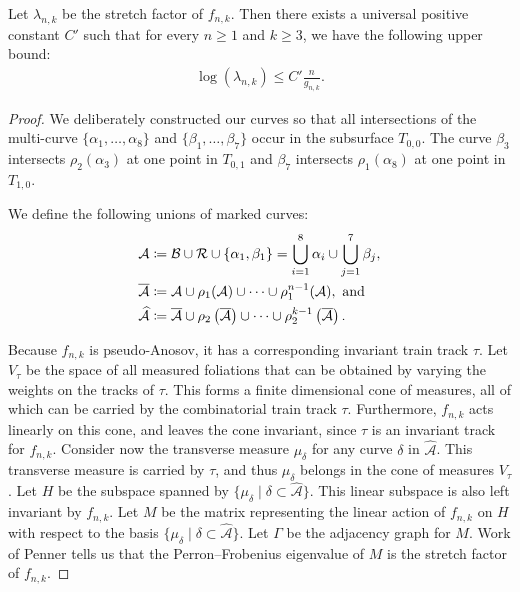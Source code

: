 \begin{lem}\label{lem:upperbound}
  Let $\lambda_{n,k}$ be the stretch factor of $f_{n,k}$. Then there exists a universal positive constant $C'$ such that for every $n \geq 1$ and $k \geq 3$, we have the following upper bound:
  \begin{align*}
   \log(\lambda_{n,k}) \leq C'\frac{n}{g_{n,k}}.
  \end{align*}
\end{lem}

\begin{proof}
 We deliberately constructed our curves so that all intersections of the multi-curve $\{\alpha_1,\dots,\alpha_8\}$ and $\{\beta_1,\dots,\beta_7\}$ occur in the subsurface $T_{0,0}$. The curve $\beta_3$ intersects $\rho_2(\alpha_3)$ at one point in $T_{0,1}$ and $\beta_7$ intersects $\rho_1(\alpha_8)$ at one point in $T_{1,0}$.

  We define the following unions of marked curves:
\begin{align*}
  \mathcal{A} &\coloneqq \mathcal{B} \cup \mathcal{R} \cup \{\alpha_1,\beta_1\} =\bigcup_{i=1}^8\alpha_i\cup\bigcup_{j=1}^7\beta_j,\\
  \smallskip
  \overline{\mathcal{A}} &\coloneqq \mathcal{A} \cup \rho_1(\mathcal{A}) \cup \dots \cup \rho_1^{n-1}(\mathcal{A}),\text{ and}\\
  \widehat{\mathcal{A}} &\coloneqq \overline{\mathcal{A}} \cup \rho_2\left(\overline{\mathcal{A}}\right) \cup \dots \cup \rho_2^{k-1}\left(\overline{\mathcal{A}}\right).
\end{align*}

Because $f_{n,k}$ is pseudo-Anosov, it has a corresponding invariant train track $\tau$.
Let $V_{\tau}$ be the space of all measured foliations that can be obtained by varying the weights on the tracks of $\tau$.
This forms a finite dimensional cone of measures, all of which can be carried by the combinatorial train track $\tau$.
Furthermore, $f_{n,k}$ acts linearly on this cone, and leaves the cone invariant, since $\tau$ is an invariant track for $f_{n,k}$.
Consider now the transverse measure $\mu_{\delta}$ for any curve $\delta$ in $\widehat{\mathcal{A}}$.
This transverse measure is carried by $\tau$, and thus $\mu_{\delta}$ belongs in the cone of measures $V_{\tau}$.
Let $H$ be the subspace spanned by $\{\mu_\delta \mid \delta\subset\widehat{\mathcal{A}}\}$.
This linear subspace is also left invariant by $f_{n,k}$.  Let $M$
be the matrix representing the linear action of $f_{n,k}$ on $H$ with respect to the basis $\{\mu_\delta \mid \delta\subset\widehat{\mathcal{A}}\}$.  Let $\Gamma$ be the adjacency graph for $M$. Work of Penner \cite{penner1988construction} tells us that the Perron--Frobenius eigenvalue of $M$ is the stretch factor of $f_{n,k}$.



\end{proof}
